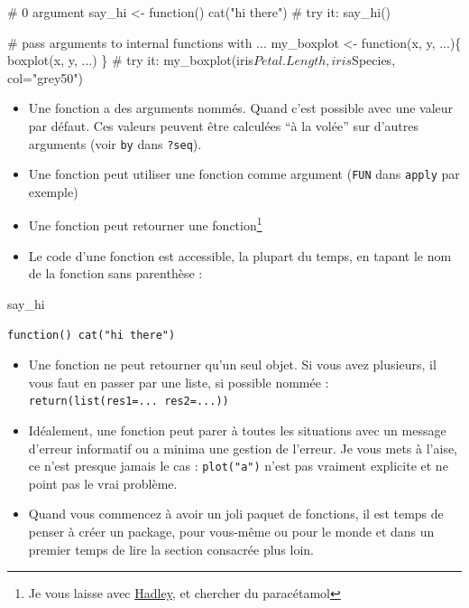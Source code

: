 \documentclass[
  letterpaper,
  DIV=11,
  numbers=noendperiod]{scrreprt}
\newenvironment{Shaded}{\begin{snugshade}}{\end{snugshade}}
\newcommand{\CommentTok}[1]{\textcolor[rgb]{0.37,0.37,0.37}{#1}}
\newcommand{\ControlFlowTok}[1]{\textcolor[rgb]{0.00,0.23,0.31}{#1}}
\newcommand{\FunctionTok}[1]{\textcolor[rgb]{0.28,0.35,0.67}{#1}}
\newcommand{\NormalTok}[1]{\textcolor[rgb]{0.00,0.23,0.31}{#1}}
\newcommand{\OtherTok}[1]{\textcolor[rgb]{0.00,0.23,0.31}{#1}}
\newcommand{\StringTok}[1]{\textcolor[rgb]{0.13,0.47,0.30}{#1}}
\providecommand{\tightlist}{%
  \setlength{\itemsep}{0pt}\setlength{\parskip}{0pt}}\usepackage{longtable,booktabs,array}
\begin{document}
\begin{Shaded}
\begin{Highlighting}[]
\CommentTok{\# 0 argument}
\NormalTok{say\_hi }\OtherTok{\textless{}{-}} \ControlFlowTok{function}\NormalTok{() }\FunctionTok{cat}\NormalTok{(}\StringTok{"hi there"}\NormalTok{)}
\CommentTok{\# try it: say\_hi()}

\CommentTok{\# pass arguments to internal functions with \textasciigrave{}...\textasciigrave{}}
\NormalTok{my\_boxplot }\OtherTok{\textless{}{-}} \ControlFlowTok{function}\NormalTok{(x, y, ...)\{}
  \FunctionTok{boxplot}\NormalTok{(x, y, ...)}
\NormalTok{\}}
\CommentTok{\# try it: my\_boxplot(iris$Petal.Length, iris$Species, col="grey50")}
\end{Highlighting}
\end{Shaded}

\begin{itemize}
\item
  Une fonction a des arguments nommés. Quand c'est possible avec une
  valeur par défaut. Ces valeurs peuvent être calculées ``à la volée''
  sur d'autres arguments (voir \texttt{by} dans \texttt{?seq}).
\item
  Une fonction peut utiliser une fonction comme argument (\texttt{FUN}
  dans \texttt{apply} par exemple)
\item
  Une fonction peut retourner une fonction\footnote{Je vous laisse avec
    \href{https://adv-r.hadley.nz/function-factories.html}{Hadley}, et
    chercher du paracétamol}
\end{itemize}

\begin{itemize}
\tightlist
\item
  Le code d'une fonction est accessible, la plupart du temps, en tapant
  le nom de la fonction sans parenthèse :
\end{itemize}

\begin{Shaded}
\begin{Highlighting}[]
\NormalTok{say\_hi}
\end{Highlighting}
\end{Shaded}

\begin{verbatim}
function() cat("hi there")
\end{verbatim}

\begin{itemize}
\item
  Une fonction ne peut retourner qu'un seul objet. Si vous avez
  plusieurs, il vous faut en passer par une liste, si possible nommée :
  \texttt{return(list(res1=...\ res2=...))}
\item
  Idéalement, une fonction peut parer à toutes les situations avec un
  message d'erreur informatif ou a minima une gestion de l'erreur. Je
  vous mets à l'aise, ce n'est presque jamais le cas :
  \texttt{plot("a")} n'est pas vraiment explicite et ne point pas le
  vrai problème.
\item
  Quand vous commencez à avoir un joli paquet de fonctions, il est temps
  de penser à créer un package, pour vous-même ou pour le monde et dans
  un premier temps de lire la section consacrée plus loin.
\end{itemize}
\end{document}
